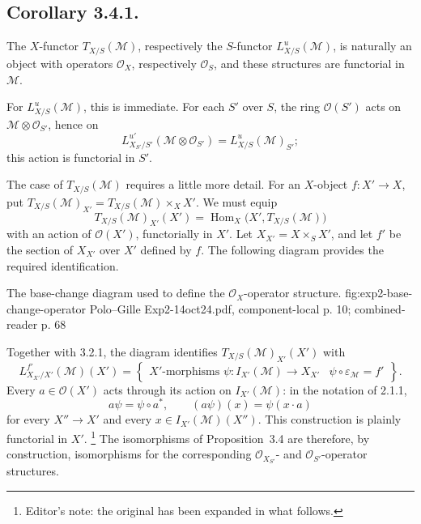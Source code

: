 \subsection*{Corollary 3.4.1.}
The \(X\)-functor \(T_{X/S}(\mathcal M)\), respectively the \(S\)-functor
\(L^u_{X/S}(\mathcal M)\), is naturally an object with operators
\(\mathcal O_X\), respectively \(\mathcal O_S\), and these structures
are functorial in \(\mathcal M\).

For \(L^u_{X/S}(\mathcal M)\), this is immediate. For each \(S'\) over
\(S\), the ring \(\mathcal O(S')\) acts on
\(\mathcal M\otimes\mathcal O_{S'}\), hence on
\[
  L^{u'}_{X_{S'}/S'}(\mathcal M\otimes\mathcal O_{S'})
  =L^u_{X/S}(\mathcal M)_{S'};
\]
this action is functorial in \(S'\).

The case of \(T_{X/S}(\mathcal M)\) requires a little more detail. For an
\(X\)-object \(f:X'\to X\), put
\(T_{X/S}(\mathcal M)_{X'}=T_{X/S}(\mathcal M)\times_X X'\). We must
equip
\[
  T_{X/S}(\mathcal M)_{X'}(X')
  =\operatorname{Hom}_X\bigl(X',T_{X/S}(\mathcal M)\bigr)
\]
with an action of \(\mathcal O(X')\), functorially in \(X'\). Let
\(X_{X'}=X\times_S X'\), and let \(f'\) be the section of \(X_{X'}\)
over \(X'\) defined by \(f\). The following diagram provides the required
identification.

  {The base-change diagram used to define the \(\mathcal O_X\)-operator structure.}
  {fig:exp2-base-change-operator}
  {Polo--Gille Exp2-14oct24.pdf, component-local p. 10; combined-reader p. 68}

Together with 3.2.1, the diagram identifies
\(T_{X/S}(\mathcal M)_{X'}(X')\) with
\[
  L^{f'}_{X_{X'}/X'}(\mathcal M)(X')
  =\left\{
    \begin{array}{c|c}
      X'\text{-morphisms }\psi:I_{X'}(\mathcal M)\to X_{X'}
      &\psi\circ\varepsilon_{\mathcal M}=f'
    \end{array}
  \right\}.
\]
Every \(a\in\mathcal O(X')\) acts through its action on
\(I_{X'}(\mathcal M)\): in the notation of 2.1.1,
\[
  a\psi=\psi\circ a^*,
  \qquad (a\psi)(x)=\psi(x\cdot a)
\]
for every \(X''\to X'\) and every \(x\in I_{X'}(\mathcal M)(X'')\).
This construction is plainly functorial in \(X'\).
\footnote{Editor's note: the original has been expanded in what follows.}
The isomorphisms of Proposition~3.4 are therefore, by construction,
isomorphisms for the corresponding \(\mathcal O_{X_{S'}}\)- and
\(\mathcal O_{S'}\)-operator structures.

